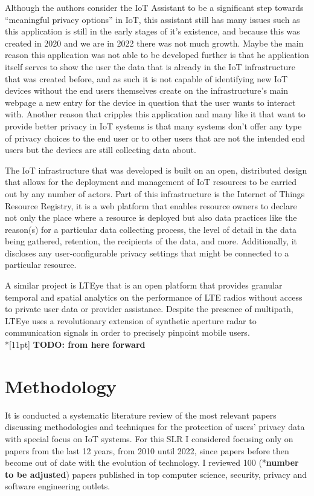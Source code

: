 \documentclass[conference]{IEEEtran}
\begin{document}
Although the authors consider the IoT Assistant to be a significant step towards
``meaningful privacy options'' in IoT, this assistant still has many issues such as
this application is still in the early stages of it's existence, and because this was
created in 2020 and we are in 2022 there was not much growth. Maybe the main reason
this application was not able to be developed further is that he application itself
serves to show the user the data that is already in the IoT infrastructure that was created before,
and as such it is not capable of identifying new IoT devices without the end users themselves
create on the infrastructure's main webpage \cite{DasPersonalized} a new entry for the device in question that the
user wants to interact with. Another reason that cripples this application and many like
it that want to provide better privacy in IoT systems is that many systems don't
offer any type of privacy choices to the end user or to other users that are not
the intended end users but the devices are still collecting data about.

The IoT infrastructure that was developed \cite{DasPersonalized} is built on an open, distributed design
that allows for the deployment and management of IoT resources to be carried out
by any number of actors. Part of this infrastructure is the Internet of Things Resource Registry,
it is a web platform that enables resource owners to declare not only the place where a
resource is deployed but also data practices like the reason(s) for a particular data collecting
process, the level of detail in the data being gathered, retention, the recipients of the data,
and more. Additionally, it discloses any user-configurable privacy settings that might be
connected to a particular resource.

A similar project is LTEye \cite{KumarLTE} that is an open
platform that provides granular temporal and spatial analytics on the performance of LTE
radios without access to private user data or provider assistance. Despite the presence of
multipath, LTEye uses a revolutionary extension of synthetic aperture radar to communication
signals in order to precisely pinpoint mobile users.
\\*[11pt]
\textbf{TODO: from here forward}


\section{Methodology}

It is conducted a systematic literature review of the most relevant papers
discussing methodologies and techniques for the protection of users' privacy data
with special focus on IoT systems. For this SLR I considered focusing only
on papers from the last 12 years, from 2010 until 2022, since papers before then
become out of date with the evolution of technology. I reviewed 100 (*\textbf{\color{red}number to be adjusted}) papers published
in top computer science, security, privacy and software engineering outlets.
\end{document}
